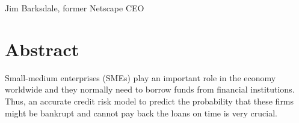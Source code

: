 \documentclass[11pt, oneside]{Thesis} %
\begin{document}
	\begin{flushright}
		Jim Barksdale, former Netscape CEO
	\end{flushright}
	
	\vfill\vfill\vfill\vfill\vfill\vfill\null %
	
	\clearpage %
	
	\begin{comment}

	\addtotoc{Abstract} %
	
	\abstract{\addtocontents{toc}{\vspace{1em}} 
		\textit{Small-medium enterprises (SMEs) play an important role in the economy 
			worldwide  and  they  normally  need  to  borrow  funds  from  financial 
			institutions.  Thus,  an  accurate  credit  risk  model  to  predict  the  probability 
			that  these  firms  might  be  bankrupt  and  cannot  pay  back  the  loans  on 
			time is very crucial.}
	\end{comment}
		
	\chapter*{\centering Abstract}
	Small-medium enterprises (SMEs) play an important role in the economy 
	worldwide  and  they  normally  need  to  borrow  funds  from  financial 
	institutions.  Thus,  an  accurate  credit  risk  model  to  predict  the  probability 
	that  these  firms  might  be  bankrupt  and  cannot  pay  back  the  loans  on 
	time is very crucial.
		
		\clearpage %
		
		
		
		
		\clearpage %
		
\end{document}

